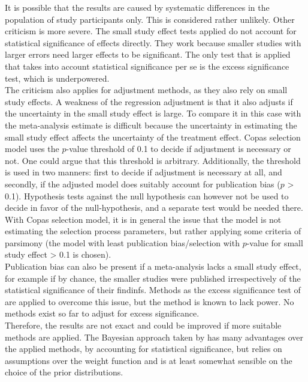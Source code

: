 \documentclass[11pt,a4paper,twoside]{book}\usepackage[]{graphicx}\usepackage[]{color}
\begin{document}
It is possible that the results are caused by systematic differences in the population of study participants only. This is considered rather unlikely. Other criticism is more severe. The small study effect tests applied do not account for statistical significance of effects directly. They work because smaller studies with larger errors need larger effects to be significant. The only test that is applied that takes into account statistical significance per se is the excess significance test, which is underpowered.\\
The criticism also applies for adjustment methods, as they also rely on small study effects. A weakness of the regression adjustment is that it also adjusts if the uncertainty in the small study effect is large. To compare it in this case with the meta-analysis estimate is difficult because the uncertainty in estimating the small study effect affects the uncertainty of the treatment effect. Copas selection model uses the $p$-value threshold of 0.1 to decide if adjustment is necessary or not. One could argue that this threshold is arbitrary. Additionally, the threshold is used in two manners: first to decide if adjustment is necessary at all, and secondly, if the adjusted model does suitably account for publication bias ($p$ > 0.1). Hypothesis tests against the null hypothesis can however not be used to decide in favor of the null-hypothesis, and a separate test would be needed there. \\
With Copas selection model, it is in general the issue that the model is not estimating the selection process parameters, but rather applying some criteria of parsimony (the model with least publication bias/selection with $p$-value for small study effect > 0.1 is chosen). \\
Publication bias can also be present if a meta-analysis lacks a small study effect, for example if by chance, the smaller studies were published irrespectively of the statistical significance of their findinfs. Methods as the excess significance test of \citet{excess.significance} are applied to overcome this issue, but the method is known to lack power. No methods exist so far to adjust for excess significance.\\
Therefore, the results are not exact and could be improved if more suitable methods are applied. The Bayesian approach taken by \citet{kicinsky} has many advantages over the applied methods, \eg by accounting for statistical significance, but relies on assumptions over the weight function and is at least somewhat sensible on the choice of the prior distributions. \\
\end{document}
